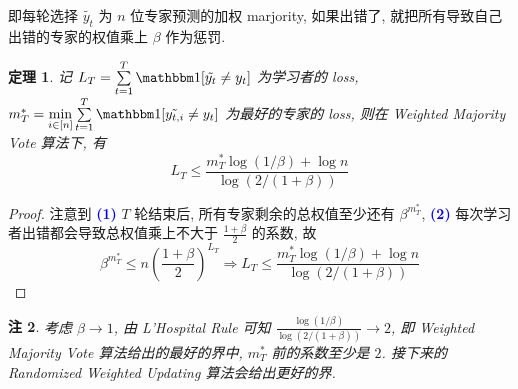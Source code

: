 \documentclass[8pt]{article}
\theoremstyle{compact}
\newtheorem{theorem}{定理}[section]
\newtheorem{remark}[theorem]{注}
\def\num#1{\textnormal{\textbf{\mbox{\textcolor{blue}{(#1)}}}}}
\def\le{\leqslant}
\begin{document}
即每轮选择 $\tilde{y_t}$ 为 $n$ 位专家预测的加权  marjority, 如果出错了, 就把所有导致自己出错的专家的权值乘上 $\beta$ 作为惩罚.

\begin{theorem}
	记 $L_T = \sum\limits_{t=1}^{T}\mathbbm 1[\tilde{y_t} \neq y_t]$ 为学习者的 loss, $m_T^* = \min\limits_{i \in [n]}\sum\limits_{t=1}^{T}\mathbbm 1[\tilde{y_{t, i}} \neq y_t]$ 为最好的专家的 loss, 则在 Weighted Majority Vote 算法下, 有 $$L _T \le \frac{m_T^*\log(1 / \beta) + \log n}{\log(2/(1 + \beta))}$$
\end{theorem}
\begin{proof}
	注意到 \num{1} $T$ 轮结束后, 所有专家剩余的总权值至少还有 $\beta^{m_T^*}$, \num{2} 每次学习者出错都会导致总权值乘上不大于 $\frac{1 + \beta}{2}$ 的系数, 故
	$$\beta^{m_T^*} \le n\left(\frac{1 + \beta}{2}\right)^{L_T} \Rightarrow L_T \le \frac{m_T^*\log(1 / \beta) + \log n}{\log(2/(1 + \beta))}$$
\end{proof}
\begin{remark}
	考虑 $\beta \to 1$, 由 L'Hospital Rule 可知 $\frac{\log(1 / \beta)}{\log(2 / (1 + \beta))} \to 2$, 即 Weighted Majority Vote 算法给出的最好的界中, $m_T^*$ 前的系数至少是 $2$. 接下来的 Randomized Weighted Updating 算法会给出更好的界.
\end{remark}
\end{document}
